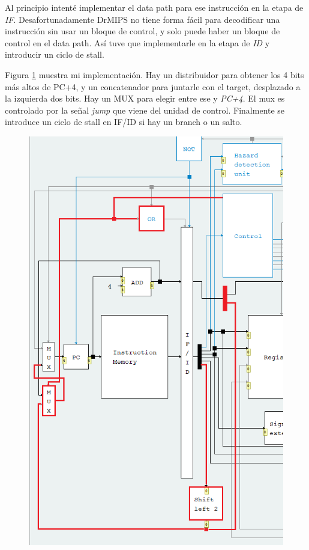 \documentclass[a4paper]{article}
\begin{document}
Al principio intenté implementar el data path para ese instrucción en la etapa de \textit{IF}. Desafortunadamente DrMIPS no tiene forma fácil para decodificar una instrucción sin usar un bloque de control, y solo puede haber un bloque de control en el data path. Así tuve que implementarle en la etapa de \textit{ID} y introducir un ciclo de stall.

Figura \ref{fig:j_pipeline} muestra mi implementación. Hay un distribuidor para obtener los 4 bits más altos de PC+4, y un concatenador para juntarle con el target, desplazado a la izquierda dos bits. Hay un MUX para elegir entre ese y \textit{PC+4}. El mux es controlado por la señal \textit{jump} que viene del unidad de control. Finalmente se introduce un ciclo de stall en IF/ID si hay un branch o un salto.

\begin{figure}[h]
\centering
\includegraphics[scale=.5]{./img/j_pipeline.png}
\label{fig:j_pipeline}
\end{figure}
\end{document}
